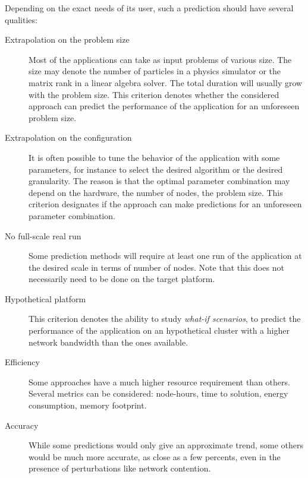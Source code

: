         Depending on the exact needs of its user, such a prediction should have several qualities:
        \begin{description}
            \item[Extrapolation on the problem size] Most of the applications can take as input problems of various
                size. The size may denote the number of particles in a physics simulator or the matrix rank in a linear
                algebra solver. The total duration will usually grow with the problem size. This criterion denotes
                whether the considered approach can predict the performance of the application for an unforeseen problem
                size.
            \item[Extrapolation on the configuration] It is often possible to tune the behavior of the application with
                some parameters, for instance to select the desired algorithm or the desired granularity. The reason is
                that the optimal parameter combination may depend on the hardware, the number of nodes, the problem
                size. This criterion designates if the approach can make predictions for an unforeseen parameter
                combination.
            \item[No full-scale real run] Some prediction methods will require at least one run of the application at
                the desired scale in terms of number of nodes. Note that this does not necessarily need to be done on
                the target platform.
            \item[Hypothetical platform] This criterion denotes the ability to study \emph{what-if scenarios}, \eg to
                predict the performance of the application on an hypothetical cluster with a higher network bandwidth
                than the ones available.
            \item[Efficiency] Some approaches have a much higher resource requirement than others. Several metrics can
                be considered: node-hours, time to solution, energy consumption, memory footprint.
            \item[Accuracy] While some predictions would only give an approximate trend, some others would be much more
                accurate, as close as a few percents, even in the presence of perturbations like network contention.
        \end{description}


